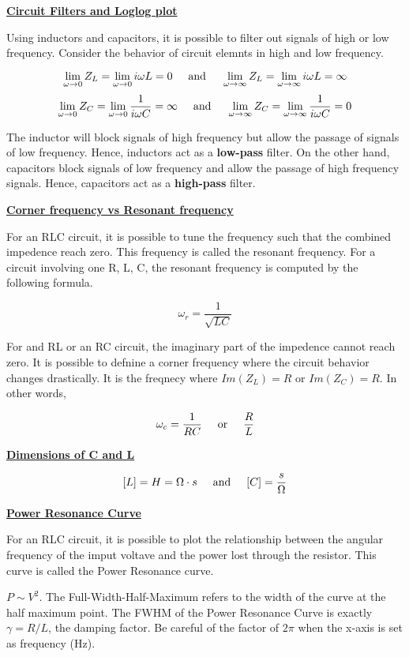 \documentclass{article}
\newcommand{\new}[1]{
    \vspace{2mm}
    \noindent
    \textbf{
    \underline{#1}}
}
\newcommand{\textOr}{
    {
        \hspace{5mm}
        \textrm{or}
        \hspace{5mm}
    }
}
\newcommand{\textAnd}{
    {
        \hspace{5mm}
        \textrm{and}
        \hspace{5mm}
    }
}
\newcommand{\fullFigure}[2]{
\begin{center}
\texttt{[image: \{\#1]}}
\end{center}
}
\begin{document}
\new{Circuit Filters and Loglog plot}
Using inductors and capacitors, it is possible to filter 
out signals of high or low frequency. Consider the behavior 
of circuit elemnts in high and low frequency. 

\[
    \lim_{\omega \rightarrow 0} Z_L = 
    \lim_{\omega \rightarrow 0} i\omega L = 0
    \textAnd
    \lim_{\omega \rightarrow \infty} Z_L = 
    \lim_{\omega \rightarrow \infty} i\omega L = \infty
\]
\[
    \lim_{\omega \rightarrow 0} Z_C = 
    \lim_{\omega \rightarrow 0} \frac 1{i\omega C} = \infty
    \textAnd
    \lim_{\omega \rightarrow \infty} Z_C = 
    \lim_{\omega \rightarrow \infty} \frac 1{i\omega C} = 0
\]

The inductor will block signals of high frequency 
but allow the passage of signals of low frequency. 
Hence, inductors act as a \textbf{low-pass} filter. On the 
other hand, capacitors block signals of low frequency 
and allow the passage of high frequency signals. 
Hence, capacitors act as a \textbf{high-pass} filter. 


\new{Corner frequency vs Resonant frequency} 
For an RLC circuit, it is possible to tune the frequency 
such that the combined impedence reach zero. This 
frequency is called the resonant frequency. 
For a circuit involving one R, L, C, the resonant frequency 
is computed by the following formula. 

\[
    \omega_r = \frac 1 {\sqrt{LC}}
\]

For and RL or an RC circuit, the imaginary part of the 
impedence cannot reach zero. It is possible to defnine 
a corner frequency where the circuit behavior changes 
drastically. It is the freqnecy where $Im(Z_L) = R$ 
or $Im(Z_C) = R$. In other words, 

\[
    \omega_c = {\frac 1 {RC}}
    \textOr 
    {\frac R L}
\]

\new{Dimensions of C and L}
\[
    [L] = H = \Omega \cdot s 
    \textAnd 
    [C] = \frac s \Omega
\]

\new{Power Resonance Curve}
For an RLC circuit, it is possible to plot 
the relationship between the angular frequency 
of the imput voltave and the power lost 
through the resistor. This curve is 
called the Power Resonance curve. 

$P \sim V^2$. 
The Full-Width-Half-Maximum refers to the 
width of the curve at the half maximum point. 
The FWHM of the Power Resonance Curve is 
exactly $\gamma = R/L$, the damping factor. 
Be careful of the factor of $2\pi$ when 
the x-axis is set as frequency (Hz). 
\end{document}
